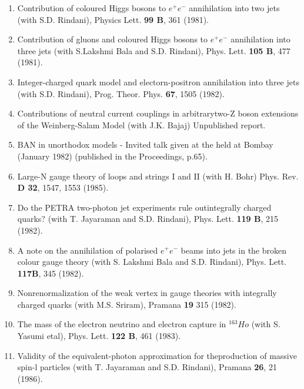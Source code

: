 \begin{enumerate}
\item Contribution of coloured Higgs bosons to $e^+ e^-$ annihilation
into two jets (with S.D. Rindani), Physics Lett. {\bf 99 B}, 361 (1981).

\item Contribution of gluons and coloured Higgs bosons to $e^+ e^-$
annihilation into three jets (with S.Lakshmi Bala and S.D. Rindani), 
Phys. Lett. {\bf 105 B}, 477 (1981).

\item Integer-charged quark model and electorn-positron annihilation
into three jets (with S.D. Rindani), Prog. Theor. Phys. {\bf 67}, 1505 (1982).

\item Contributions of neutral current couplings in arbitrary\break two-Z
boson extensions of the Weinberg-Salam Model (with J.K. Bajaj)
Unpublished report.

\item BAN in unorthodox models - Invited talk given at the held at Bombay (January 1982)
(published in the Proceedings, p.65).

\item Large-N gauge theory of loops and strings I and II (with H. Bohr)
Phys. Rev. {\bf D 32}, 1547, 1553 (1985).

\item Do the PETRA two-photon jet experiments rule out\break integrally
charged quarks?  (with T. Jayaraman and S.D. Rindani), Phys. Lett. {\bf
119 B}, 215 (1982).

\item A note on the annihilation of polarised $e^+ e^-$ beams into jets
in the broken colour gauge theory (with S. Lakshmi Bala and S.D.
Rindani), Phys. Lett. {\bf 117B}, 345 (1982).

\item Nonrenormalization of the weak vertex in gauge theories with
integrally charged quarks (with M.S. Sriram), Pramana {\bf 19} 315
(1982). 

\item The mass of the electron neutrino and electron capture in
$^{163}Ho$ (with S. Yasumi etal), Phys. Lett. {\bf 122 B}, 461 (1983).

\item Validity of the equivalent-photon approximation for the\break production
of massive spin-l particles (with T. Jayaraman and S.D. Rindani), Pramana
{\bf 26}, 21 (1986).


\end{enumerate}
